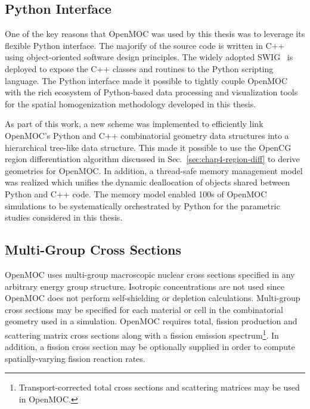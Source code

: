 \subsection{Python Interface}
\label{subsubsec:chap4-openmoc-python}

One of the key reasons that OpenMOC was used by this thesis was to leverage its flexible Python interface. The majorify of the source code is written in C++ using object-oriented software design principles. The widely adopted \ac{SWIG}~\cite{beazley2003swig} is deployed to expose the C++ classes and routines to the Python scripting language. The Python interface made it possible to tightly couple OpenMOC with the rich ecosystem of Python-based data processing and visualization tools for the spatial homogenization methodology developed in this thesis.

As part of this work, a new scheme was implemented to efficiently link OpenMOC's Python and C++ combinatorial geometry data structures into a hierarchical tree-like data structure. This made it possible to use the OpenCG region differentiation algorithm discussed in Sec.~\ref{sec:chap4-region-diff} to derive geometries for OpenMOC. In addition, a thread-safe memory management model was realized which unifies the dynamic deallocation of objects shared between Python and C++ code. The memory model enabled 100s of OpenMOC simulations to be systematically orchestrated by Python for the parametric studies considered in this thesis.


\subsection{Multi-Group Cross Sections}
\label{subsubsec:chap4-openmoc-mgxs}

OpenMOC uses multi-group macroscopic nuclear cross sections specified in any arbitrary energy group structure. Isotropic concentrations are not used since OpenMOC does not perform self-shielding or depletion calculations. Multi-group cross sections may be specified for each material or cell in the combinatorial geometry used in a simulation. OpenMOC requires total, fission production and scattering matrix cross sections along with a fission emission spectrum\footnote{Transport-corrected total cross sections and scattering matrices may be used in OpenMOC.}. In addition, a fission cross section may be optionally supplied in order to compute spatially-varying fission reaction rates.

